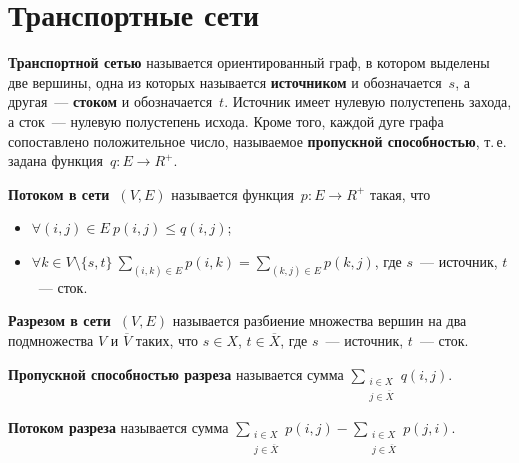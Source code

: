 \section{Транспортные сети}
   \textbf{Транспортной сетью} называется ориентированный граф, в котором выделены две вершины, одна из которых называется \textbf{источником} и обозначается~$s$, а другая~--- \textbf{стоком} и обозначается~$t$.
Источник имеет нулевую полустепень захода, а сток~--- нулевую полустепень исхода.
 Кроме того, каждой дуге графа сопоставлено положительное число, называемое \textbf{пропускной способностью}, т.\,е. задана функция~$q \colon E \to R^+$.

 \textbf{Потоком в сети~$(V, E)$} называется функция~$p \colon E \to R^+$ такая, что
\begin{itemize}
	\item $\forall (i, j) \in E \ p(i, j) \leqslant q(i, j)$;
	\item $\displaystyle \forall k \in V \setminus \{ s, t \} \ \sum_{(i, k) \in E} p(i, k) = \sum_{(k, j) \in E} p(k, j)$, где $s$~--- источник, $t$~--- сток.
\end{itemize}

 \textbf{Разрезом в сети~$(V, E)$} называется разбиение множества вершин на два подмножества $V$ и $\overline V$ таких, что $s \in X$, $t \in \overline X$, где $s$~--- источник, $t$~--- сток.

\textbf{Пропускной способностью разреза} называется сумма $\displaystyle \sum_{\begin{smallmatrix}
i \in X \\
j \in \overline X
\end{smallmatrix}} q(i, j)$.

\textbf{Потоком разреза} называется сумма $\displaystyle \sum_{\begin{smallmatrix}
i \in X \\
j \in \overline X
\end{smallmatrix}} p(i, j) -
\sum_{\begin{smallmatrix}
i \in X \\
j \in \overline X
\end{smallmatrix}} p(j, i)$.